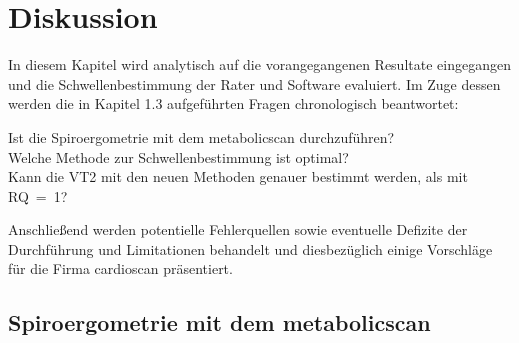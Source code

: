\chapter{Diskussion}

In diesem Kapitel wird analytisch auf die vorangegangenen Resultate eingegangen und die Schwellenbestimmung der Rater und Software evaluiert. Im Zuge dessen werden die in Kapitel 1.3 aufgeführten Fragen chronologisch beantwortet:
%
\begin{tabbing}
	Ist die Spiroergometrie mit dem metabolicscan durchzuführen?\\
	Welche Methode zur Schwellenbestimmung ist optimal?\\
	Kann die VT2 mit den neuen Methoden genauer bestimmt werden, als mit RQ~=~1?
\end{tabbing}
%
Anschließend werden potentielle Fehlerquellen sowie eventuelle Defizite der Durchführung und Limitationen behandelt und diesbezüglich einige Vorschläge für die Firma cardioscan präsentiert.
%

\section{Spiroergometrie mit dem metabolicscan}

